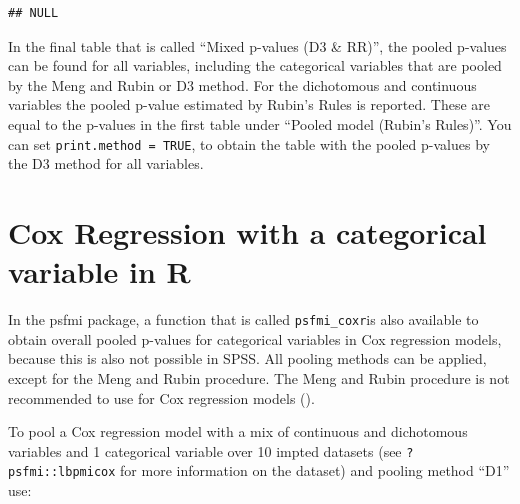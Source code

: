 \documentclass[
]{book}
\newenvironment{Shaded}{\begin{snugshade}}{\end{snugshade}}
\newcommand{\NormalTok}[1]{#1}
\newcommand{\OperatorTok}[1]{\textcolor[rgb]{0.81,0.36,0.00}{\textbf{#1}}}
\begin{document}
\begin{Shaded}
\end{Shaded}

\begin{verbatim}
## NULL
\end{verbatim}

In the final table that is called ``Mixed p-values (D3 \& RR)'', the pooled p-values can be found for all variables, including the categorical variables that are pooled by the Meng and Rubin or D3 method. For the dichotomous and continuous variables the pooled p-value estimated by Rubin's Rules is reported. These are equal to the p-values in the first table under ``Pooled model (Rubin's Rules)''. You can set \texttt{print.method\ =\ TRUE}, to obtain the table with the pooled p-values by the D3 method for all variables.

\hypertarget{cox-regression-with-a-categorical-variable-in-r}{%
\section{Cox Regression with a categorical variable in R}\label{cox-regression-with-a-categorical-variable-in-r}}

In the psfmi package, a function that is called \texttt{psfmi\_coxr}is also available to obtain overall pooled p-values for categorical variables in Cox regression models, because this is also not possible in SPSS. All pooling methods can be applied, except for the Meng and Rubin procedure. The Meng and Rubin procedure is not recommended to use for Cox regression models (\citet{Marshall2009MedResMeth}).

To pool a Cox regression model with a mix of continuous and dichotomous variables and 1 categorical variable over 10 impted datasets (see \texttt{?psfmi::lbpmicox} for more information on the dataset) and pooling method ``D1'' use:
\end{document}
